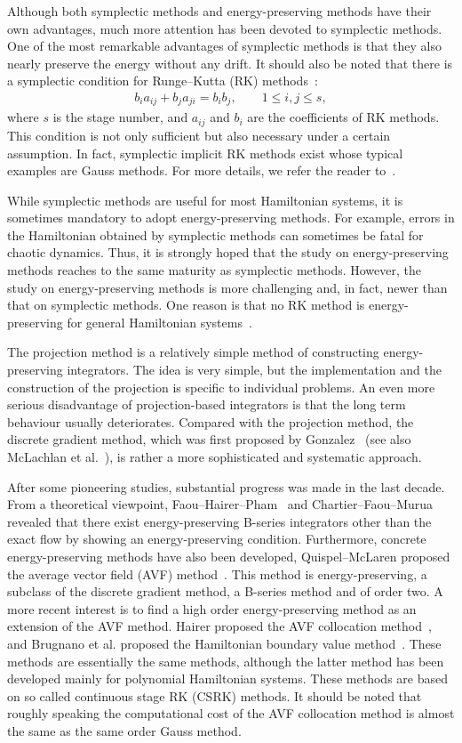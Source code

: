 \documentclass[final,leqno,onefignum,onetabnum]{siamltex1213}
\begin{document}
Although both symplectic methods and energy-preserving methods
have their own advantages,
much more attention has been devoted to symplectic methods.
One of the most remarkable advantages of symplectic methods
is that
they also nearly preserve the energy without any drift.
It should  also be
noted that
there is a symplectic condition for Runge--Kutta (RK) methods~\cite{la88,sa88,su88}:
\begin{align*}
b_ia_{ij}+b_ja_{ji}=b_ib_j, \qquad 1\leq i,j\leq s,
\end{align*}
where $s$ is the stage number, and $a_{ij}$ and $b_i$ are the coefficients of RK methods.
This condition is not only sufficient but also necessary under a certain assumption.
In fact, symplectic implicit RK methods exist whose typical examples are
Gauss methods.
For more details, we refer the reader to~\cite{ha06}.

While symplectic methods are useful for most Hamiltonian systems,
it is sometimes mandatory to adopt energy-preserving methods.
For example, errors in the Hamiltonian obtained by symplectic methods
can sometimes be fatal for chaotic dynamics. 
Thus, it is strongly hoped that the study on energy-preserving methods
reaches to the same maturity as symplectic methods.
However, the study on energy-preserving methods is more challenging
and, in fact, newer than that on symplectic methods.
One reason is that no RK method is energy-preserving
for general Hamiltonian systems~\cite{ce09}.

The projection method is a relatively simple method of
constructing energy-preserving integrators.
The idea is very simple, but the implementation and
the construction of the projection is specific to individual problems.
An even more serious disadvantage of projection-based integrators is that
the long term behaviour  usually deteriorates.  Compared with the projection method,
the discrete gradient method, which was first proposed by Gonzalez~\cite{go96}
(see also McLachlan et al.~\cite{mc99}),
is rather a more sophisticated and systematic approach.

After some pioneering studies,
substantial progress was made in the last decade.
From a theoretical viewpoint,
Faou--Hairer--Pham~\cite{fhp04} and Chartier--Faou--Murua~\cite{cfm06} 
revealed that
there exist energy-preserving B-series integrators
other than the exact flow
by showing an energy-preserving condition.
Furthermore,
concrete energy-preserving methods have also been developed,
Quispel--McLaren proposed the average vector field (AVF) method~\cite{qu08}.
This method is energy-preserving, a subclass of the discrete gradient method,
a B-series method
and of order two.
A more recent interest is to find a high order energy-preserving method
as an extension of the AVF method.
Hairer proposed the AVF collocation method~\cite{ha10},
and Brugnano et al. proposed the Hamiltonian boundary value method~\cite{bru10}.
These methods are essentially the same methods,
although the latter method has been developed mainly for polynomial 
Hamiltonian systems.
These methods are based on so called continuous stage RK (CSRK) methods.
It should be noted that
roughly speaking
the computational cost of the AVF collocation method
is almost the same as the same order Gauss method. 
\end{document}
